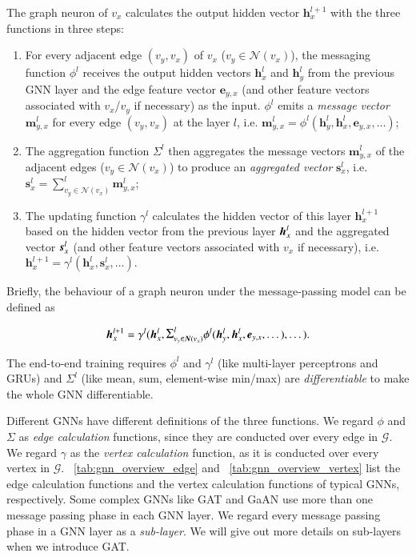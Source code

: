 The graph neuron of $v_x$ calculates the output hidden vector $\boldsymbol{h}^{l+1}_x$ with the three functions in three steps:
%
\begin{enumerate}
    \item  For every adjacent edge $(v_y, v_x)$ of $v_x$ ($v_y \in \mathcal{N}(v_x)$), the messaging function $\phi^l$ receives the output hidden vectors $\boldsymbol{h}^l_x$ and $\boldsymbol{h}^l_y$ from the previous GNN layer and the edge feature vector $\boldsymbol{e}_{y,x}$ (and other feature vectors associated with $v_x$/$v_y$ if necessary) as the input.
    $\phi^l$ emits a \emph{message vector} $\boldsymbol{m}^l_{y,x}$ for every edge $(v_y, v_x)$ at the layer $l$, i.e. $\boldsymbol{m}^l_{y,x} = \phi^l(\boldsymbol{h}^l_y, \boldsymbol{h}^l_x, \boldsymbol{e}_{y,x}, \dots)$;
    \item The aggregation function $\Sigma^l$ then aggregates the message vectors $\boldsymbol{m}^l_{y,x}$ of the adjacent edges ($v_y \in \mathcal{N}(v_x)$) to produce an \emph{aggregated vector} $\boldsymbol{s}^l_x$, i.e. $\boldsymbol{s}^l_{x} = \sum^l_{v_y \in \mathcal{N}(v_x)}{\boldsymbol{m}^l_{y,x}}$;
    \item The updating function $\gamma^l$ calculates the {hidden vector} of this layer $\boldsymbol{h}^{l+1}_x$ based on the hidden vector from the previous layer $\boldsymbol{h}^l_x$ and the aggregated vector $\boldsymbol{s}^l_x$ (and other feature vectors associated with $v_x$ if necessary), i.e. $\boldsymbol{h}^{l+1}_x = \gamma^l(\boldsymbol{h}^l_x, \boldsymbol{s}^l_x, \dots)$.
\end{enumerate}

Briefly, the behaviour of a graph neuron under the message-passing model can be defined as  

\begin{equation}
      \MyVec{h}^{l+1}_x = \gamma^l(\MyVec{h}^l_x, \mathlarger{\Sigma}^l_{v_y \in \MyVec{N}(v_x)}{\phi^l(\MyVec{h}^l_y, \MyVec{h}^l_x,   \MyVec{e}_{y,x}, \dots)}, \dots).
\end{equation}

The end-to-end training requires $\phi^l$ and $\gamma^l$ (like multi-layer perceptrons and GRUs) and $\Sigma^l$ (like mean, sum, element-wise min/max) are \emph{differentiable} to make the whole GNN differentiable.

Different GNNs have different definitions of the three functions.
%
We regard $\phi$ and $\Sigma$ as \emph{edge calculation} functions, since they are conducted over every edge in $\mathcal{G}$.
%
We regard $\gamma$ as the \emph{vertex calculation} function, as it is conducted over every vertex in $\mathcal{G}$.
%
\tablename~\ref{tab:gnn_overview_edge} and \tablename~\ref{tab:gnn_overview_vertex} list the edge calculation functions and the vertex calculation functions of typical GNNs, respectively.
%
Some complex GNNs like GAT \cite{huang2018_gat} and GaAN  \cite{zhang2018_gaan} use more than one message passing phase in each GNN layer.
%
We regard every message passing phase in a GNN layer as a \emph{sub-layer}.
%
We will give out more details on sub-layers when we introduce GAT.

